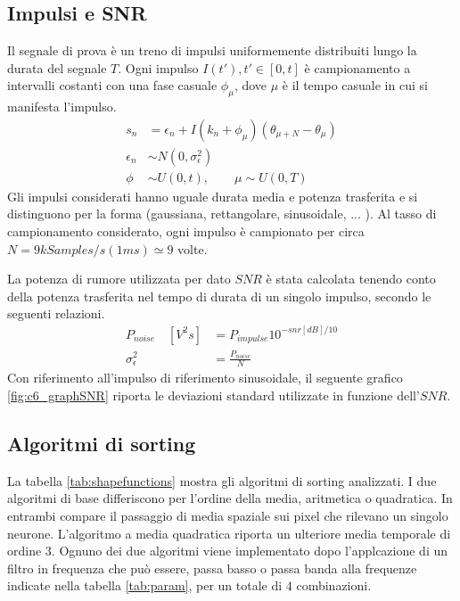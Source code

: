 \documentclass[9pt,twocolumn,twoside]{osajnl}
\begin{document}
\subsection{Impulsi e SNR}

Il segnale di prova è un treno di impulsi uniformemente distribuiti lungo la durata del segnale $T$. Ogni impulso $I(t'), t'\in[0,t]$ è campionamento a intervalli costanti con una fase casuale $\phi_{\mu}$, dove $\mu$ è il tempo casuale in cui si manifesta l'impulso.
%
\begin{align*}
 s_{n} &= \epsilon_{n} + I(k_{n} + \phi_{\mu})(\theta_{\mu+N} - \theta_{\mu})    \\
 \epsilon_{n} & \sim N(0,\sigma^{2}_{\epsilon})   \\
 \phi & \sim U(0,t), \quad\quad \mu  \sim  U(0,T )
\end{align*}
%
Gli impulsi considerati hanno uguale durata media e potenza trasferita e si distinguono per la forma (gaussiana, rettangolare, sinusoidale, ... ). Al tasso di campionamento considerato, ogni impulso è campionato per circa $N = 9kSamples/s (1ms) \simeq 9$ volte.

La potenza di rumore utilizzata per dato $SNR$ è stata calcolata tenendo conto della potenza trasferita nel tempo di durata di un singolo impulso, secondo le seguenti relazioni.
\begin{align*}
P_{noise} \quad [V^2s] &=  P_{impulse} 10^{- snr [dB]/10} \\
\sigma^{2}_{\epsilon} &= \frac{ P_{noise} }{ N }
\end{align*}
Con riferimento all'impulso di riferimento sinusoidale, il seguente grafico \ref{fig:c6_graphSNR} riporta le deviazioni standard utilizzate in funzione dell'$SNR$.
%



\subsection{Algoritmi di sorting}

La tabella \ref{tab:shapefunctions} mostra gli algoritmi di sorting analizzati.
I due algoritmi di base differiscono per l'ordine della media, aritmetica o quadratica. In entrambi compare il passaggio di media spaziale sui pixel che rilevano un singolo neurone. L'algoritmo a media quadratica riporta un ulteriore media temporale di ordine $3$. Ognuno dei due algoritmi viene implementato dopo l'applcazione di un filtro in frequenza che può essere, passa basso o passa banda alla frequenze indicate nella tabella \ref{tab:param}, per un totale di $4$ combinazioni.
\end{document}
